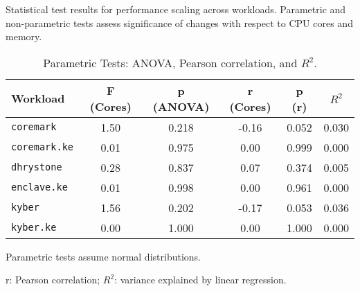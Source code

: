 \begin{table}[htbp]
\centering
\caption{Statistical test results for performance scaling across workloads. Parametric and non-parametric tests assess significance of changes with respect to CPU cores and memory.}
\label{tab:statistical-tests}
\begin{subtable}[t]{\textwidth}
\centering
\caption{Parametric Tests: ANOVA, Pearson correlation, and $R^2$.}
\vspace{0.5em}
\begin{tabular}{@{}l
                S[table-format=1.2] S[table-format=1.3]
                S[table-format=1.2] S[table-format=1.3]
                S[table-format=1.3]@{}}
\toprule
\textbf{Workload} 
& \textbf{F (Cores)} & \textbf{p (ANOVA)} 
& \textbf{r (Cores)} & \textbf{p (r)} 
& \textbf{$R^2$} \\
\midrule
\texttt{coremark}      & 1.50 & 0.218 & -0.16 & 0.052 & 0.030 \\
\texttt{coremark.ke}   & 0.01 & 0.975 &  0.00 & 0.999 & 0.000 \\
\texttt{dhrystone}     & 0.28 & 0.837 &  0.07 & 0.374 & 0.005 \\
\texttt{enclave.ke}    & 0.01 & 0.998 &  0.00 & 0.961 & 0.000 \\
\texttt{kyber}         & 1.56 & 0.202 & -0.17 & 0.053 & 0.036 \\
\texttt{kyber.ke}      & 0.00 & 1.000 &  0.00 & 1.000 & 0.000 \\
\bottomrule
\end{tabular}
\begin{tablenotes}
\footnotesize
\item Parametric tests assume normal distributions.
\item r: Pearson correlation; $R^2$: variance explained by linear regression.
\end{tablenotes}
\end{subtable}

\vspace{1.5em}


\end{table}
